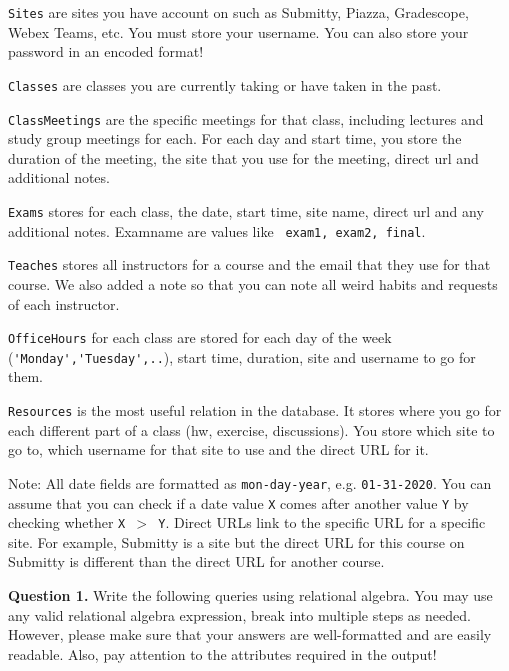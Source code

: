 \documentclass[11pt]{article}
\begin{document}
{\tt Sites} are sites you have account on such as Submitty, Piazza,
Gradescope, Webex Teams, etc. You must store your username. You can
also store your password in an encoded format!

{\tt Classes} are classes you are currently taking or have taken in the past. 

{\tt ClassMeetings} are the specific meetings for that class,
including lectures and study group meetings for each. For each day and
start time, you store the duration of the meeting, the site that you
use for the meeting, direct url and additional notes.

{\tt Exams} stores for each class, the date, start time, site name,
direct url and any additional notes. Examname are values like {\tt
  exam1, exam2, final}.

{\tt Teaches} stores all instructors for a course and the email that
they use for that course. We also added a note so that you can note
all weird habits and requests of each instructor.

{\tt OfficeHours} for each class are stored for each day of the week
(\verb+'Monday','Tuesday',..+), start time, duration, site and
username to go for them.

{\tt Resources} is the most useful relation in the database. It stores
where you go for each different part of a class (hw, exercise,
discussions). You store which site to go to, which username for that
site to use and the direct URL for it.

Note: All date fields are formatted as \verb+mon-day-year+,
e.g. \verb+01-31-2020+. You can assume that you can check if a date
value {\tt X} comes after another value {\tt Y} by checking whether
{\tt X $>$ Y}. Direct URLs link to the specific URL for a specific
site. For example, Submitty is a site but the direct URL for this
course on Submitty is different than the direct URL for another
course.

  \newpage

{\bf Question 1.}
Write the following queries using relational algebra. You may use any
valid relational algebra expression, break into multiple steps as
needed. However, please make sure that your answers are well-formatted
and are easily readable. Also, pay attention to the attributes
required in the output!
\end{document}

